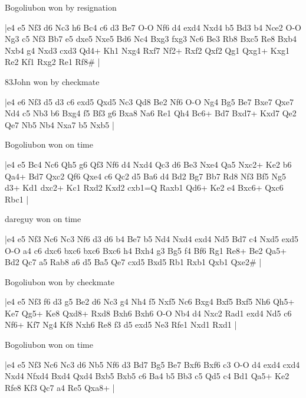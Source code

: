 Bogoliubon won by resignation

\makegametitle
|e4 e5 Nf3 d6 Nc3 h6 Bc4 c6 d3 Be7 O-O Nf6 d4 exd4 Nxd4 b5 Bd3 b4 Nce2 O-O Ng3 c5 Nf3 Bb7 e5 dxe5 Nxe5 Bd6 Nc4 Bxg3 fxg3 Nc6 Be3 Rb8 Bxc5 Re8 Bxb4 Nxb4 g4 Nxd3 cxd3 Qd4+ Kh1 Nxg4 Rxf7 Nf2+ Rxf2 Qxf2 Qg1 Qxg1+ Kxg1 Re2 Kf1 Rxg2 Re1 Rf8\#  |

\showboard

83John won by checkmate

\makegametitle
|e4 e6 Nf3 d5 d3 c6 exd5 Qxd5 Nc3 Qd8 Be2 Nf6 O-O Ng4 Bg5 Be7 Bxe7 Qxe7 Nd4 c5 Nb3 b6 Bxg4 f5 Bf3 g6 Bxa8 Na6 Re1 Qh4 Bc6+ Bd7 Bxd7+ Kxd7 Qe2 Qe7 Nb5 Nb4 Nxa7 b5 Nxb5  |

\showboard

Bogoliubon won on time

\makegametitle
|e4 e5 Bc4 Nc6 Qh5 g6 Qf3 Nf6 d4 Nxd4 Qc3 d6 Be3 Nxe4 Qa5 Nxc2+ Ke2 b6 Qa4+ Bd7 Qxc2 Qf6 Qxe4 c6 Qc2 d5 Ba6 d4 Bd2 Bg7 Bb7 Rd8 Nf3 Bf5 Ng5 d3+ Kd1 dxc2+ Kc1 Rxd2 Kxd2 cxb1=Q Raxb1 Qd6+ Ke2 e4 Bxc6+ Qxc6 Rbc1  |

\showboard

dareguy won on time

\makegametitle
|e4 e5 Nf3 Nc6 Nc3 Nf6 d3 d6 b4 Be7 b5 Nd4 Nxd4 exd4 Nd5 Bd7 c4 Nxd5 exd5 O-O a4 c6 dxc6 bxc6 bxc6 Bxc6 h4 Bxh4 g3 Bg5 f4 Bf6 Rg1 Re8+ Be2 Qa5+ Bd2 Qc7 a5 Rab8 a6 d5 Ba5 Qe7 cxd5 Bxd5 Rb1 Rxb1 Qxb1 Qxe2\#  |

\showboard

Bogoliubon won by checkmate

\makegametitle
|e4 e5 Nf3 f6 d3 g5 Be2 d6 Nc3 g4 Nh4 f5 Nxf5 Nc6 Bxg4 Bxf5 Bxf5 Nh6 Qh5+ Ke7 Qg5+ Ke8 Qxd8+ Rxd8 Bxh6 Bxh6 O-O Nb4 d4 Nxc2 Rad1 exd4 Nd5 c6 Nf6+ Kf7 Ng4 Kf8 Nxh6 Re8 f3 d5 exd5 Ne3 Rfe1 Nxd1 Rxd1  |

\showboard

Bogoliubon won on time

\makegametitle
|e4 e5 Nf3 Nc6 Nc3 d6 Nb5 Nf6 d3 Bd7 Bg5 Be7 Bxf6 Bxf6 c3 O-O d4 exd4 cxd4 Nxd4 Nfxd4 Bxd4 Qxd4 Bxb5 Bxb5 c6 Ba4 b5 Bb3 c5 Qd5 c4 Bd1 Qa5+ Ke2 Rfe8 Kf3 Qc7 a4 Re5 Qxa8+  |

